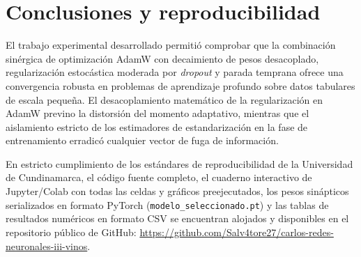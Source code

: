 \documentclass[12pt,letterpaper]{article}
\begin{document}
\section{Conclusiones y reproducibilidad}
El trabajo experimental desarrollado permitió comprobar que la combinación sinérgica de optimización AdamW con decaimiento de pesos desacoplado, regularización estocástica moderada por \textit{dropout} y parada temprana ofrece una convergencia robusta en problemas de aprendizaje profundo sobre datos tabulares de escala pequeña. El desacoplamiento matemático de la regularización en AdamW previno la distorsión del momento adaptativo, mientras que el aislamiento estricto de los estimadores de estandarización en la fase de entrenamiento erradicó cualquier vector de fuga de información.

En estricto cumplimiento de los estándares de reproducibilidad de la Universidad de Cundinamarca, el código fuente completo, el cuaderno interactivo de Jupyter/Colab con todas las celdas y gráficos preejecutados, los pesos sinápticos serializados en formato PyTorch (\texttt{modelo\_seleccionado.pt}) y las tablas de resultados numéricos en formato CSV se encuentran alojados y disponibles en el repositorio público de GitHub: \url{https://github.com/Salv4tore27/carlos-redes-neuronales-iii-vinos}.
\end{document}
